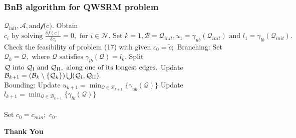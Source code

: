 \documentclass[usenames,dvipsnames]{beamer}
\begin{document}
\begin{frame}[fragile]
  \frametitle{BnB algorithm for QWSRM problem}
  \vspace*{-1\baselineskip}
  \footnotesize
  \begin{block}{}
        \begin{algorithmic}

	  \Input $\mathcal{Q}_{\text{init}}, \mathcal{A}, \text{and} \mathcal{f} \text{(c)}.$
	  \Initialize Obtain $c_{i} \text{ by solving } \frac{\delta f(c)}{\delta c_{i}}=0, \text{ for } i\in\mathcal{N}.\text{ Set } k = 1, \mathcal{B} = \mathcal{Q}_{init},u_{1}=\gamma_{ub}(\mathcal{Q}_{init}) \text{ and } l_{1} = \gamma_{lb}(\mathcal{Q}_{init}).$\\
	  Check the feasibility of problem (17) with given
	  \State $c_{0} = \widetilde{c};$
	  \Else
	  \State Branching:
\State\quad{} Set $\mathcal{Q}_{k} = \mathcal{Q}, \text{ where } \mathcal{Q} \text{ satisfies } \gamma_{lb}(\mathcal{Q}) = l_{k}.$
	  \State\quad{} Split $\mathcal{Q} \text{ into } \mathcal{Q}_{\rm{I}} \text{ and } \mathcal{Q}_{\rm{II}}, \text{ along one of its longest edges.}$
	     \State\quad{} Update $\mathcal{B}_{k+1} = (\mathcal{B}_{k}\setminus{\{\mathcal{Q}_{k}\}})\bigcup(\mathcal{Q}_{\rm{I}}, \mathcal{Q}_{\rm{II}}).$\\
	  \State Bounding:
	    \State\quad{} Update $u_{k+1} = \min_{\mathcal{Q}\in\mathcal{B}_{k+1}}{\{\gamma_{ub}(\mathcal{Q})}\}$
\State\quad{} Update $l_{k+1} = \min_{\mathcal{Q}\in\mathcal{B}_{k+1}}{\{\gamma_{lb}(\mathcal{Q})}\}$\\
	  \EndWhile\\
	  Set $c_{0} = c_{min};$
	  \EndIf
	  \Output $c_{0}.$
        \end{algorithmic}
    \end{block}
\end{frame}
\begin{frame}{\phantom{}}
  \color{Sepia}
  \centering \Huge\textbf{Thank You}
\end{frame}
\end{document}
